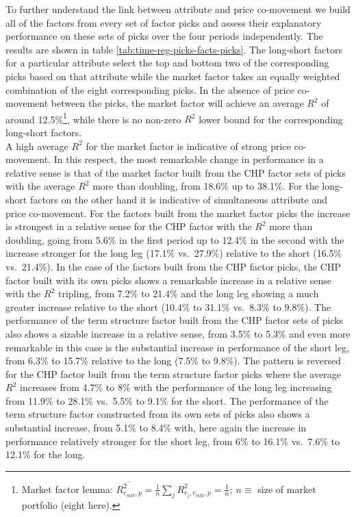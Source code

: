 \documentclass[]{elsarticle} %
\begin{document}
\medskip\setlength{\parindent}{0pt}

To further understand the link between attribute and price co-movement we build all of the factors from every set of factor picks and assess their explanatory performance on these sets of picks over the four periods independently. The results are shown in table \ref{tab:time-reg-picks-facts-picks}. The long-short factors for a particular attribute select the top and bottom two of the corresponding picks based on that attribute while the market factor takes an equally weighted combination of the eight corresponding picks. In the absence of price co-movement between the picks, the market factor will achieve an average \(R^{2}\) of around 12.5\%\footnote{Market factor lemma: \(\overline{R_{r_{mkt}, p}^{2}} = \frac{1}{n} \sum_{j} R_{r_{j}, r_{mkt}, p}^{2} = \frac{1}{n}; \: n\equiv\) size of market portfolio (eight here).}, while there is no non-zero \(R^{2}\) lower bound for the corresponding long-short factors.\\
A high average \(R^{2}\) for the market factor is indicative of strong price co-movement. In this respect, the most remarkable change in performance in a relative sense is that of the market factor built from the CHP factor sets of picks with the average \(R^{2}\) more than doubling, from 18.6\% up to 38.1\%. For the long-short factors on the other hand it is indicative of simultaneous attribute and price co-movement. For the factors built from the market factor picks the increase is strongest in a relative sense for the CHP factor with the \(R^{2}\) more than doubling, going from 5.6\% in the first period up to 12.4\% in the second with the increase stronger for the long leg (17.1\% vs.~27.9\%) relative to the short (16.5\% vs.~21.4\%). In the case of the factors built from the CHP factor picks, the CHP factor built with its own picks shows a remarkable increase in a relative sense with the \(R^{2}\) tripling, from 7.2\% to 21.4\% and the long leg showing a much greater increase relative to the short (10.4\% to 31.1\% vs.~8.3\% to 9.8\%). The performance of the term structure factor built from the CHP factor sets of picks also shows a sizable increase in a relative sense, from 3.5\% to 5.3\% and even more remarkable in this case is the substantial increase in performance of the short leg, from 6.3\% to 15.7\% relative to the long (7.5\% to 9.8\%). The pattern is reversed for the CHP factor built from the term structure factor picks where the average \(R^{2}\) increases from 4.7\% to 8\% with the performance of the long leg increasing from 11.9\% to 28.1\% vs.~5.5\% to 9.1\% for the short. The performance of the term structure factor constructed from its own sets of picks also shows a substantial increase, from 5.1\% to 8.4\% with, here again the increase in performance relatively stronger for the short leg, from 6\% to 16.1\% vs.~7.6\% to 12.1\% for the long.\\
\end{document}
